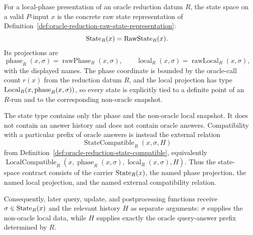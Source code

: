 \begin{definition}
  \label{def:oracle-reduction-state-space}
  For a local-phase presentation of an oracle reduction datum $R$, the state
  space on a valid $P$-input $x$ is the concrete raw state representation
  of Definition~\ref{def:oracle-reduction-raw-state-representation}:
  \[
    \operatorname{State}_R(x)=\operatorname{RawState}_R(x).
  \]
  Its projections are
  \[
    \operatorname{phase}_R(x,\sigma)
      =\operatorname{rawPhase}_R(x,\sigma),
    \qquad
    \operatorname{local}_R(x,\sigma)
      =\operatorname{rawLocal}_R(x,\sigma),
  \]
  with the displayed names.  The phase coordinate is bounded by the oracle-call
  count $r(x)$ from the reduction datum $R$, and the local projection has type
  $\operatorname{Local}_R(x,\operatorname{phase}_R(x,\sigma))$, so every state is explicitly
  tied to a definite point of an $R$-run and to the corresponding non-oracle
  snapshot.

  The state type contains only the phase and the non-oracle local snapshot.
  It does not contain an answer history and does not contain oracle answers.
  Compatibility with a particular prefix of oracle answers is instead the
  external relation
  \[
    \operatorname{StateCompatible}_R(x,\sigma,H)
  \]
  from Definition~\ref{def:oracle-reduction-state-compatible}, equivalently
  $\operatorname{LocalCompatible}_R(x,\operatorname{phase}_R(x,\sigma),
  \operatorname{local}_R(x,\sigma),H)$.  Thus the state-space contract consists
  of the carrier $\operatorname{State}_R(x)$, the named phase projection, the named local
  projection, and the named external compatibility relation.

  Consequently, later query, update, and postprocessing functions receive
  $\sigma\in\operatorname{State}_R(x)$ and the relevant history $H$ as separate arguments:
  $\sigma$ supplies the non-oracle local data, while $H$ supplies exactly the
  oracle query-answer prefix determined by $R$.
\end{definition}

